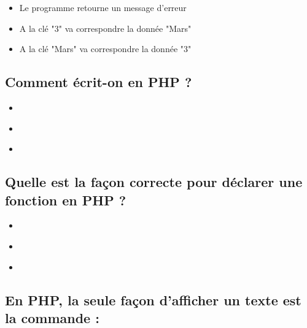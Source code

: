 \documentclass[11pt,a4paper]{article}
\begin{document}

\bigskip

\begin{itemize}
\item[\CaseCoche] Le programme retourne un message d'erreur \\
\item[\CaseCoche] A la clé "3" va correspondre la donnée "Mars" \\
\item[\CaseCoche] A la clé "Mars" va correspondre la donnée "3" \\
\end{itemize}


\subsection{Comment écrit-on  en PHP ?}

\begin{itemize}
\item[\CaseCoche]  \\
\item[\CaseCoche]  \\
\item[\CaseCoche]  \\
\end{itemize}


\subsection{Quelle est la façon correcte pour déclarer une fonction  en PHP ?}

\begin{itemize}
\item[\CaseCoche]  \\
\item[\CaseCoche]  \\
\item[\CaseCoche]  \\
\end{itemize}


\subsection{En PHP, la seule façon d'afficher un texte est la commande  :}
\end{document}
